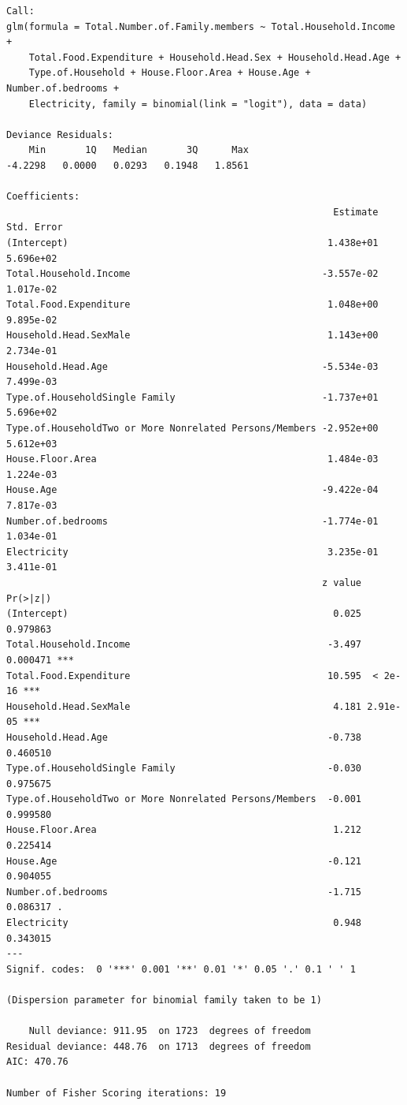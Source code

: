 \documentclass[
]{article}
\begin{document}
\begin{verbatim}
Call:
glm(formula = Total.Number.of.Family.members ~ Total.Household.Income + 
    Total.Food.Expenditure + Household.Head.Sex + Household.Head.Age + 
    Type.of.Household + House.Floor.Area + House.Age + Number.of.bedrooms + 
    Electricity, family = binomial(link = "logit"), data = data)

Deviance Residuals: 
    Min       1Q   Median       3Q      Max  
-4.2298   0.0000   0.0293   0.1948   1.8561  

Coefficients:
                                                          Estimate Std. Error
(Intercept)                                              1.438e+01  5.696e+02
Total.Household.Income                                  -3.557e-02  1.017e-02
Total.Food.Expenditure                                   1.048e+00  9.895e-02
Household.Head.SexMale                                   1.143e+00  2.734e-01
Household.Head.Age                                      -5.534e-03  7.499e-03
Type.of.HouseholdSingle Family                          -1.737e+01  5.696e+02
Type.of.HouseholdTwo or More Nonrelated Persons/Members -2.952e+00  5.612e+03
House.Floor.Area                                         1.484e-03  1.224e-03
House.Age                                               -9.422e-04  7.817e-03
Number.of.bedrooms                                      -1.774e-01  1.034e-01
Electricity                                              3.235e-01  3.411e-01
                                                        z value Pr(>|z|)    
(Intercept)                                               0.025 0.979863    
Total.Household.Income                                   -3.497 0.000471 ***
Total.Food.Expenditure                                   10.595  < 2e-16 ***
Household.Head.SexMale                                    4.181 2.91e-05 ***
Household.Head.Age                                       -0.738 0.460510    
Type.of.HouseholdSingle Family                           -0.030 0.975675    
Type.of.HouseholdTwo or More Nonrelated Persons/Members  -0.001 0.999580    
House.Floor.Area                                          1.212 0.225414    
House.Age                                                -0.121 0.904055    
Number.of.bedrooms                                       -1.715 0.086317 .  
Electricity                                               0.948 0.343015    
---
Signif. codes:  0 '***' 0.001 '**' 0.01 '*' 0.05 '.' 0.1 ' ' 1

(Dispersion parameter for binomial family taken to be 1)

    Null deviance: 911.95  on 1723  degrees of freedom
Residual deviance: 448.76  on 1713  degrees of freedom
AIC: 470.76

Number of Fisher Scoring iterations: 19
\end{verbatim}
\end{document}
